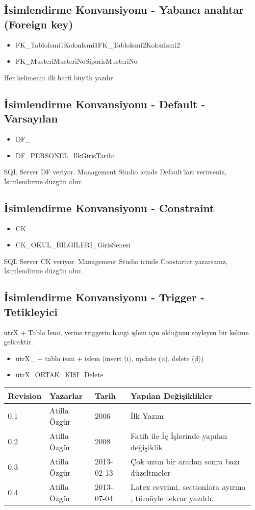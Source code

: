 \documentclass[10pt,a4paper,draft]{article}
\begin{document}
\subsection{İsimlendirme Konvansiyonu - Yabancı anahtar (Foreign key)}  
\begin{itemize}
\item  FK\_TabloIsmi1KolonIsmi1FK\_TabloIsmi2KolonIsmi2 
\item FK\_MusteriMusteriNoSiparisMusteriNo
\end{itemize}
Her kelimenin ilk harfi büyük yazılır. 
  
\subsection{İsimlendirme Konvansiyonu - Default - Varsayılan}  
\begin{itemize}
\item DF\_
\item DF\_PERSONEL\_IlkGirisTarihi 
\end{itemize}  
  
SQL Server DF veriyor. Management Studio icinde Default'ları verirseniz, İsimlendirme düzgün olur. 		  

\subsection{İsimlendirme Konvansiyonu - Constraint }  
\begin{itemize}
\item CK\_
\item CK\_OKUL\_BILGILERI\_GirisSenesi  
\end{itemize}  
  
SQL Server CK veriyor. Management Studio icinde Constarint yazarsanız, İsimlendirme düzgün olur. 				 
  
\subsection{İsimlendirme Konvansiyonu - Trigger - Tetikleyici  }  
utrX + Tablo Ismi, yerine triggerin hangi işlem için olduğunu söyleyen bir kelime gelicektir. 

\begin{itemize}
\item utrX\_ + tablo ismi + islem (insert (i), update (u), delete (d))
\item utrX\_ORTAK\_KISI\_Delete
\end{itemize}  

  

\begin{tabular}{|l|l|l|l|}
\hline Revision & Yazarlar & Tarih & Yapılan Değişiklikler  \\ 
\hline 0.1 &  Atilla Özgür & 2006 & İlk Yazım   \\ 
\hline 0.2 &  Atilla Özgür & 2008 & Fatih ile İç İşlerinde yapılan değişiklik \\ 
\hline 0.3 &  Atilla Özgür & 2013-02-13 & Çok uzun bir aradan sonra bazı düzeltmeler  \\ 
\hline 0.4 &  Atilla Özgür & 2013-07-04 & Latex cevrimi, sectionlara ayırma , tümüyle tekrar yazıldı.  \\ 
\hline 
\end{tabular} 
\end{document}
